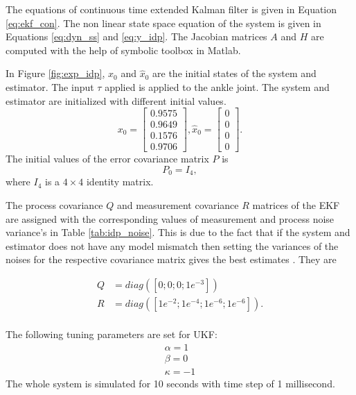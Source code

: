  The equations of continuous time extended Kalman filter is given in Equation \ref{eq:ekf_con}. The non linear state space equation of the system is given in Equations \ref{eq:dyn_ss} and \ref{eq:y_idp}. The Jacobian matrices $A$ and $H$ are computed with the help of symbolic toolbox in Matlab.

In Figure \ref{fig:exp_idp}, $x_0$ and $\hat x_0$ are the initial states of the system and estimator. The input $\tau$ applied is applied to the ankle joint. The system and estimator are initialized with different initial values. 
$$ x_0 = \begin{bmatrix} 0.9575 \\ 0.9649\\ 0.1576\\ 0.9706 \end{bmatrix}, \hat x_0 = \begin{bmatrix} 0 \\ 0\\ 0\\ 0 \end{bmatrix}.$$  
The initial values of the error covariance matrix $P$ is $$P_0 = I_4, $$ where $I_4$ is a $4 \times 4$ identity matrix.


The process covariance $Q$ and measurement covariance $R$ matrices of the EKF are assigned with the corresponding values of measurement and process noise variance's in Table \ref{tab:idp_noise}. This is due to the fact that if the system and estimator does not have any model mismatch then setting the variances of the noises for the respective covariance matrix gives the best estimates \citep{gre01}. They are 

$$  \begin{aligned}
    Q&=diag([0; 0; 0; 1e^{-3}]) \\
    R&=diag([1e^{-2}; 1e^{-4}; 1e^{-6}; 1e^{-6}]). \\
    \end{aligned}
    $$

The following tuning parameters are set for UKF:
$$  \begin{aligned}
    \alpha = 1 \\
    \beta = 0\\
    \kappa = -1 
    \end{aligned} $$ 
The whole system is simulated for 10 seconds with time step of 1 millisecond.
